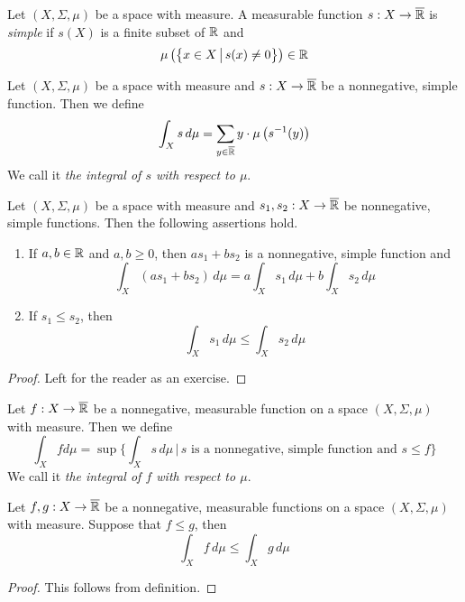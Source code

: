 \begin{definition}
Let $(X,\Sigma,\mu)$ be a space with measure. A measurable function $s:X\rightarrow \overline{{\mathbb R}}$ is \textit{simple} if $s(X)$ is a finite subset of ${\mathbb R}$ and
$$\mu\left(\big\{x\in X\,\big|\,s(x)\neq 0\big\}\right) \in {\mathbb R}$$
\end{definition}

\begin{definition}
Let $(X,\Sigma,\mu)$ be a space with measure and $s:X\rightarrow \overline{{\mathbb R}}$ be a nonnegative, simple function. Then we define
$$\int_Xs\,d\mu = \sum_{y\in \overline{{\mathbb R}}}y\cdot \mu\left(s^{-1}(y)\right)$$
We call it \textit{the integral of $s$ with respect to $\mu$}.
\end{definition}

\begin{fact}\label{fact:basicsforsimplefunctions}
Let $(X,\Sigma,\mu)$ be a space with measure and $s_1, s_2:X\rightarrow \overline{{\mathbb R}}$ be nonnegative, simple functions. Then the following assertions hold.
\begin{enumerate}[label=\emph{\textbf{(\arabic*)}}, leftmargin=*]
\item If $a, b\in {\mathbb R}$ and $a, b\geq 0$, then $a s_1 + b s_2$ is a nonnegative, simple function and 
$$\int_X\left(a s_1 + b s_2\right)\,d\mu = a \int_Xs_1\,d\mu + b \int_Xs_2\,d\mu$$
\item If $s_1\leq s_2$, then
$$\int_Xs_1\,d\mu \leq \int_Xs_2\,d\mu$$
\end{enumerate}
\end{fact}
\begin{proof}
Left for the reader as an exercise.
\end{proof}

\begin{definition}
Let $f:X\rightarrow \overline{{\mathbb R}}$ be a nonnegative, measurable function on a space $(X,\Sigma,\mu)$ with measure. Then we define 
$$\int_X f d\mu = \sup\bigg\{\int_X s\, d\mu\,\bigg|\,s\mbox{ is a nonnegative, simple function and }s\leq f\bigg\}$$
We call it \textit{the integral of $f$ with respect to $\mu$}.
\end{definition}

\begin{fact}\label{fact:integralismonotone}
Let $f,g:X\rightarrow \overline{{\mathbb R}}$ be a nonnegative, measurable functions on a space $(X,\Sigma,\mu)$ with measure. Suppose that $f\leq g$, then
$$\int_Xf\,d\mu \leq \int_Xg\,d\mu$$
\end{fact}
\begin{proof}
This follows from definition.
\end{proof}


